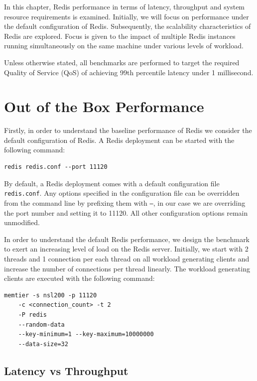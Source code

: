 In this chapter, Redis performance in terms of latency, throughput and system resource requirements is examined. Initially, we will focus on performance under the default configuration of Redis. Subsequently, the scalability characteristics of Redis are explored. Focus is given to the impact of multiple Redis instances running simultaneously on the same machine under various levels of workload.

Unless otherwise stated, all benchmarks are performed to target the required Quality of Service (QoS) of achieving 99th percentile latency under 1 millisecond.


\section{Out of the Box Performance}
\label{sec:redis-default}
Firstly, in order to understand the baseline performance of Redis we consider the default configuration of Redis. A Redis deployment can be started with the following command:
\begin{lstlisting}
redis redis.conf --port 11120
\end{lstlisting}

By default, a Redis deployment comes with a default configuration file \texttt{redis.conf}\cite{RedisConfiguration}. Any options specified in the configuration file can be overridden from the command line by prefixing them with \texttt{--}, in our case we are overriding the port number and setting it to 11120. All other configuration options remain unmodified.

In order to understand the default Redis performance, we design the benchmark to exert an increasing level of load on the Redis server. Initially, we start with 2 threads and 1 connection per each thread on all workload generating clients and increase the number of connections per thread linearly. The workload generating clients are executed with the following command:

\begin{lstlisting}
memtier -s nsl200 -p 11120
    -c <connection_count> -t 2
    -P redis
    --random-data
    --key-minimum=1 --key-maximum=10000000
    --data-size=32
\end{lstlisting}


\subsection{Latency vs Throughput}

